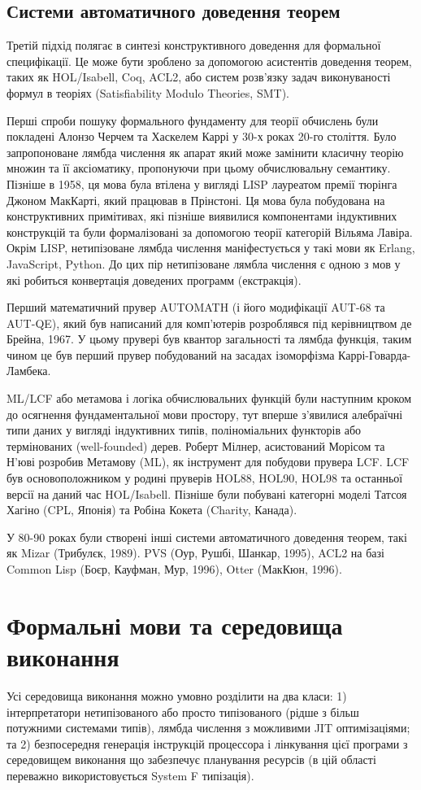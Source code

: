 \subsection{Системи автоматичного доведення теорем}
Третій підхід полягає в синтезі конструктивного доведення
для формальної специфікації. Це може бути зроблено за
допомогою асистентів доведення теорем, таких як HOL/Isabell, Coq, ACL2,
або систем розв'язку задач виконуваності формул в теоріях (Satisfiability
Modulo Theories, SMT).

Перші спроби пошуку формального фундаменту для теорії обчислень були покладені
Алонзо Черчем та Хаскелем Каррі у 30-х роках 20-го століття. Було запропоноване
лямбда числення як апарат який може замінити класичну теорію множин та її аксіоматику,
пропонуючи при цьому обчислювальну семантику. Пізніше в 1958, ця мова була втілена
у вигляді LISP лауреатом премії тюрінга Джоном МакКарті, який працював в Прінстоні.
Ця мова була побудована на конструктивних примітивах, які пізніше виявилися компонентами
індуктивних конструкцій та були формалізовані за допомогою
теорії категорій Вільяма Лавіра. Окрім LISP, нетипізоване лямбда числення
маніфестується у такі мови як Erlang, JavaScript, Python.
До цих пір нетипізоване лямбла числення є одною з мов у які робиться
конвертація доведених программ (екстракція).

Перший математичний прувер AUTOMATH (і його модифікації AUT-68 та AUT-QE),
який був написаний для комп'ютерів розроблявся під керівництвом де Брейна, 1967.
У цьому прувері був квантор загальності та лямбда функція, таким чином це був перший прувер
побудований на засадах ізоморфізма Каррі-Говарда-Ламбека.

ML/LCF або метамова і логіка обчислювальних функцій були наступним кроком до
осягнення фундаментальної мови простору, тут вперше з'явилися алебраїчні типи даних
у вигляді індуктивних типів, поліноміальних функторів або термінованих (well-founded) дерев.
Роберт Мілнер, асистований Морісом та Н'юві розробив Метамову (ML), як
інструмент для побудови прувера LCF. LCF був основоположником у родині пруверів
HOL88, HOL90, HOL98 та останньої версії на даний час HOL/Isabell.
Пізніше були побувані категорні моделі Татсоя Хагіно (CPL, Японія)
та Робіна Кокета (Charity, Канада).

У 80-90 роках були створені інші системи автоматичного доведення теорем,
такі як Mizar (Трибулєк, 1989). PVS (Оур, Рушбі, Шанкар, 1995),
ACL2 на базі Common Lisp (Боєр, Кауфман, Мур, 1996), Otter (МакКюн, 1996).

\section{Формальні мови та середовища виконання}
Усі середовища виконання можно умовно розділити на два класи:
1) інтерпретатори нетипізованого або просто
типізованого (рідше з більш потужними системами типів),
лямбда числення з можливими JIT оптимізаціями; та 2)
безпосередня генерація інструкцій процессора і лінкування цієї програми з
середовищем виконання що забезпечує планування ресурсів
(в цій області переважно використовується System F типізація).

